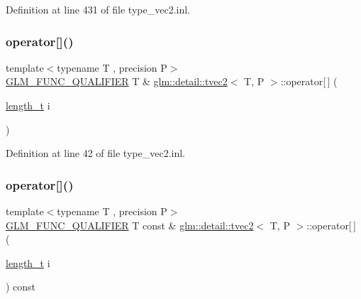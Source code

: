 Definition at line 431 of file type\+\_\+vec2.\+inl.

\mbox{\label{structglm_1_1detail_1_1tvec2_acae6c81d07fce7bf13265a8a1d9fb24c}} 
\subsubsection{\texorpdfstring{operator[]()}{operator[]()}\hspace{0.1cm}{\footnotesize\ttfamily [1/2]}}
{\footnotesize\ttfamily template$<$typename T , precision P$>$ \\
\hyperlink{setup_8hpp_a33fdea6f91c5f834105f7415e2a64407}{G\+L\+M\+\_\+\+F\+U\+N\+C\+\_\+\+Q\+U\+A\+L\+I\+F\+I\+ER} T \& \hyperlink{structglm_1_1detail_1_1tvec2}{glm\+::detail\+::tvec2}$<$ T, P $>$\+::operator\mbox{[}$\,$\mbox{]} (\begin{DoxyParamCaption}\item[{\hyperlink{namespaceglm_a090a0de2260835bee80e71a702492ed9}{length\+\_\+t}}]{i }\end{DoxyParamCaption})}



Definition at line 42 of file type\+\_\+vec2.\+inl.

\mbox{\label{structglm_1_1detail_1_1tvec2_a6ee1b2b995ab50042c68447c41db3a62}} 
\subsubsection{\texorpdfstring{operator[]()}{operator[]()}\hspace{0.1cm}{\footnotesize\ttfamily [2/2]}}
{\footnotesize\ttfamily template$<$typename T , precision P$>$ \\
\hyperlink{setup_8hpp_a33fdea6f91c5f834105f7415e2a64407}{G\+L\+M\+\_\+\+F\+U\+N\+C\+\_\+\+Q\+U\+A\+L\+I\+F\+I\+ER} T const  \& \hyperlink{structglm_1_1detail_1_1tvec2}{glm\+::detail\+::tvec2}$<$ T, P $>$\+::operator\mbox{[}$\,$\mbox{]} (\begin{DoxyParamCaption}\item[{\hyperlink{namespaceglm_a090a0de2260835bee80e71a702492ed9}{length\+\_\+t}}]{i }\end{DoxyParamCaption}) const}



